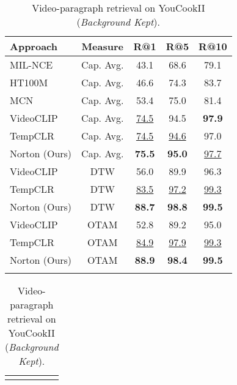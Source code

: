 \begin{table}[t]
\begin{minipage}[t]{0.55\linewidth}
    {
     \centering
        \caption{Video-paragraph retrieval on YouCookII (\textit{Background Removed}). 
        The best and second-best results are \textbf{bold} and \underline{underlined}, respectively.}
            \label{tab:youcookfull}
        {
\begin{tabular}{lcccc}
\shline
Approach & Measure & R@1 & R@5 & R@10 \\
\hline 
 MIL-NCE~\citep{milnce} & Cap. Avg. & 43.1 & 68.6 & 79.1 \\
 HT100M~\citep{howto100m} & Cap. Avg. & 46.6 & 74.3 & 83.7 \\
 MCN \citep{chen2021multimodal} & Cap. Avg. & 53.4 & 75.0 & {81.4} \\
 VideoCLIP~\citep{videoclip} & Cap. Avg. & \underline{74.5} & 94.5 & \textbf{97.9} \\
 TempCLR~\citep{tempclr} & Cap. Avg. & \underline{74.5} & \underline{94.6} & 97.0 \\
 Norton (Ours) & Cap. Avg. & \textbf{75.5} & \textbf{95.0} & \underline{97.7} \\
\hline 
 VideoCLIP~\citep{videoclip} & DTW & 56.0 & 89.9 & 96.3 \\
 TempCLR~\citep{tempclr} & DTW & \underline{83.5} & \underline{97.2} & \underline{99.3} \\
 Norton (Ours) & DTW & \textbf{88.7} & \textbf{98.8} & \textbf{99.5} \\
\hline 
 VideoCLIP~\citep{videoclip} & OTAM & 52.8 & 89.2 & 95.0\\
 TempCLR~\citep{tempclr} & OTAM &
	\underline{84.9}& \underline{97.9}& \underline{99.3}  \\
 Norton (Ours) & OTAM & \textbf{88.9} & \textbf{98.4} & \textbf{99.5} \\
\shline
\end{tabular}
}
 }   
 \end{minipage}
 \hfill
 \begin{minipage}[t]{0.37\linewidth}
    {
     \centering
        \caption{Video-paragraph retrieval on YouCookII (\textit{Background Kept}).}
   \label{tab:youcookfullbg}
{    \vspace{10.9pt}
    \begin{tabular}{lccc}
\shline


\end{tabular}}}
\end{minipage}
\end{table}
